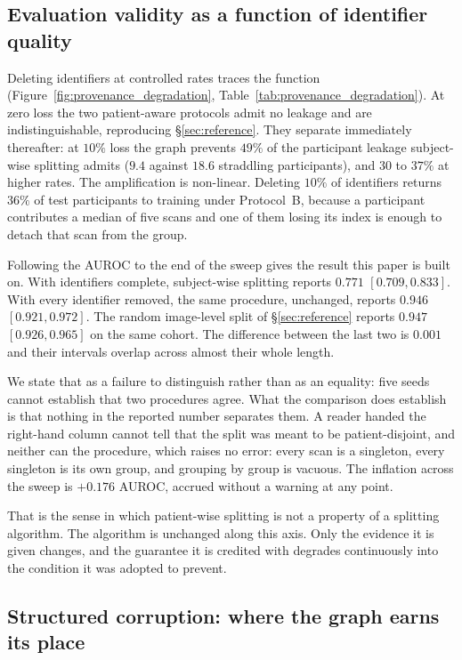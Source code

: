 \documentclass[pdflatex,sn-vancouver-num]{sn-jnl}
\begin{document}
\subsection{Evaluation validity as a function of identifier quality}
\label{sec:provenance_degradation}

Deleting identifiers at controlled rates traces the function
(Figure~\ref{fig:provenance_degradation}, Table~\ref{tab:provenance_degradation}).
At zero loss the two patient-aware protocols admit no leakage and are
indistinguishable, reproducing \S\ref{sec:reference}. They separate immediately
thereafter: at $10\%$ loss the graph prevents $49\%$ of the participant leakage
subject-wise splitting admits ($9.4$ against $18.6$ straddling participants),
and $30$ to $37\%$ at higher rates. The amplification is non-linear. Deleting
$10\%$ of identifiers returns $36\%$ of test participants to training under
Protocol~B, because a participant contributes a median of five scans and one of
them losing its index is enough to detach that scan from the group.

Following the AUROC to the end of the sweep gives the result this paper is built
on. With identifiers complete, subject-wise splitting reports $0.771$
$[0.709, 0.833]$. With every identifier removed, the same procedure, unchanged,
reports $0.946$ $[0.921, 0.972]$. The random image-level split of
\S\ref{sec:reference} reports $0.947$ $[0.926, 0.965]$ on the same cohort. The
difference between the last two is $0.001$ and their intervals overlap across
almost their whole length.

We state that as a failure to distinguish rather than as an equality: five seeds
cannot establish that two procedures agree. What the comparison does establish
is that nothing in the reported number separates them. A reader handed the
right-hand column cannot tell that the split was meant to be patient-disjoint,
and neither can the procedure, which raises no error: every scan is a singleton,
every singleton is its own group, and grouping by group is vacuous. The
inflation across the sweep is $+0.176$ AUROC, accrued without a warning at any
point.

That is the sense in which patient-wise splitting is not a property of a
splitting algorithm. The algorithm is unchanged along this axis. Only the
evidence it is given changes, and the guarantee it is credited with degrades
continuously into the condition it was adopted to prevent.

\subsection{Structured corruption: where the graph earns its place}
\label{sec:structured_corruption}
\end{document}
